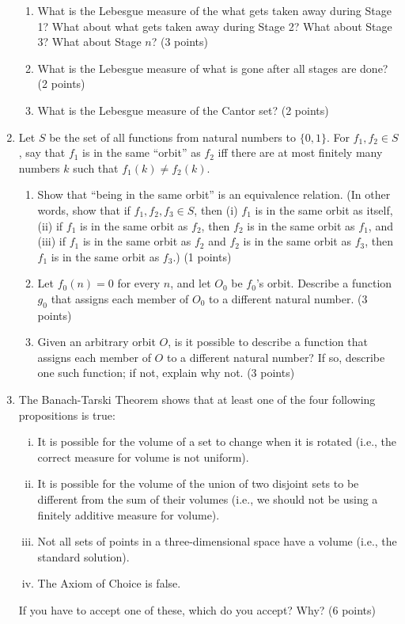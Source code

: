 \documentclass[12pt,a4paper]{article}
\begin{document}
\begin{enumerate}
\begin{enumerate}
\item What is the Lebesgue measure of the what gets taken away during Stage 1? What about what gets taken away during Stage 2? What about Stage 3? What about Stage $n$? (3 points)
\item What is the Lebesgue measure of what is gone after all stages are done? (2 points)
\item What is the Lebesgue measure of the Cantor set? (2 points)
\end{enumerate}

\item Let $S$ be the set of all functions from natural numbers to $\{0,1\}$.  For $f_1, f_2 \in S$, say that $f_1$ is in the same ``orbit'' as $f_2$ iff there are at most finitely many numbers $k$ such that $f_1(k) \neq f_2(k)$.
\begin{enumerate}

\item Show that ``being in the same orbit'' is an equivalence relation. (In other words, show that if $f_1,f_2, f_3\in S$, then (i) $f_1$ is in the same orbit as itself, (ii) if $f_1$ is
in the same orbit as $f_2$, then $f_2$ is in the same orbit as $f_1$, and (iii) if $f_1$ is in the same orbit as $f_2$ and $f_2$ is in the same orbit as $f_3$, then $f_1$ is in the same
orbit as $f_3$.) (1 points)

\item Let $f_0(n) = 0$ for every $n$, and let $O_0$ be $f_0$'s orbit. Describe a function $g_0$ that assigns each member of $O_0$ to a different natural number. (3 points)

\item Given an arbitrary orbit $O$, is it possible to describe a function that assigns each member of $O$ to a different natural number? If so, describe one such function;
if not, explain why not. (3 points)

\end{enumerate}

\item The Banach-Tarski Theorem shows that at least one of the four following propositions is true:
\begin{enumerate}[(i)]
\item It is possible for the volume of a set to change when it is rotated (i.e., the correct measure for volume is not uniform).
\item It is possible for the volume of the union of two disjoint sets to be different from the sum of their volumes (i.e., we should not be using a finitely additive measure for volume).
\item Not all sets of points in a three-dimensional space have a volume (i.e., the standard solution).
\item The Axiom of Choice is false.
\end{enumerate}

If you have to accept one of these, which do you accept? Why? (6 points)

\end{enumerate}
\end{document}
